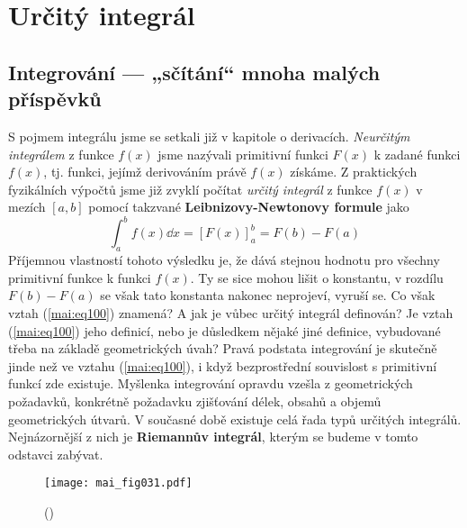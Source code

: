 \setchaptertoc
\chapter{Určitý integrál}\label{mai:IchapVIII}
  \section{Integrování — „sčítání“ mnoha malých příspěvků} 
    S pojmem integrálu jsme se setkali již v kapitole o derivacích. \emph{Neurčitým integrálem} z
    funkce \(f(x)\) jsme nazývali primitivní funkci \(F(x)\) k zadané funkci \(f(x)\), tj. funkci,
    jejímž derivováním právě \(f(x)\) získáme. Z praktických fyzikálních výpočtů jsme již zvyklí
    počítat \emph{určitý integrál} z funkce \(f(x)\) v mezích \([a, b]\) pomocí takzvané
    \textbf{Leibnizovy-Newtonovy formule} jako 
    \begin{equation}\label{mai:eq100}
      \int_a^bf(x)\dd{x} = [F(x)]_a^b = F(b) - F(a)
    \end{equation}
    Příjemnou vlastností tohoto výsledku je, že dává stejnou hodnotu pro všechny primitivní funkce k
    funkci \(f(x)\). Ty se sice mohou lišit o konstantu, v rozdílu \(F(b) - F(a)\) se však tato
    konstanta nakonec neprojeví, vyruší se. Co však vztah (\ref{mai:eq100}) znamená? A jak je vůbec
    určitý integrál definován? Je vztah (\ref{mai:eq100}) jeho definicí, nebo je důsledkem nějaké
    jiné definice, vybudované třeba na základě geometrických úvah? Pravá podstata integrování je
    skutečně jinde než ve vztahu (\ref{mai:eq100}), i když bezprostřední souvislost s primitivní
    funkcí zde existuje. Myšlenka integrování opravdu vzešla z geometrických požadavků, konkrétně
    požadavku zjišťování délek, obsahů a objemů geometrických útvarů. V současné době existuje celá
    řada typů určitých integrálů. Nejnázornější z nich je \textbf{Riemannův integrál}, kterým se
    budeme v tomto odstavci zabývat.



    \begin{figure}[ht!]  %
      \centering
      \texttt{[image: mai\_fig031.pdf]}
      \caption{
              (\cite[s.~10000]{Feynman01})}
      \label{mai:fig031}
    \end{figure}

